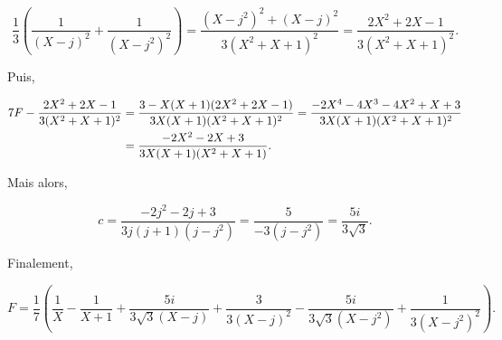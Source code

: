 {{\begin{enumerate}
$$\frac{1}{3}(\frac{1}{(X-j)^2}+\frac{1}{(X-j^2)^2})=\frac{(X-j^2)^2+(X-j)^2}{3(X^2+X+1)^2}
=\frac{2X^2+2X-1}{3(X^2+X+1)^2}.$$

Puis,

\begin{align*}\ensuremath
7F-\frac{2X^2+2X-1}{3(X^2+X+1)^2}&=\frac{3-X(X+1)(2X^2+2X-1)}{3X(X+1)(X^2+X+1)^2}
=\frac{-2X^4-4X^3-4X^2+X+3}{3X(X+1)(X^2+X+1)^2}\\
 &=\frac{-2X^2-2X+3}{3X(X+1)(X^2+X+1)}.
\end{align*}

Mais alors, 

$$c=\frac{-2j^2-2j+3}{3j(j+1)(j-j^2)}=\frac{5}{-3(j-j^2)}=\frac{5i}{3\sqrt{3}}.$$

Finalement,

$$F=\frac{1}{7}(\frac{1}{X}-\frac{1}{X+1}+\frac{5i}{3\sqrt{3}(X-j)}+\frac{3}{3(X-j)^2}-\frac{5i}{3\sqrt{3}(X-j^2)}+\frac{1}{3(X-j^2)^2}).$$

\end{enumerate}}
}